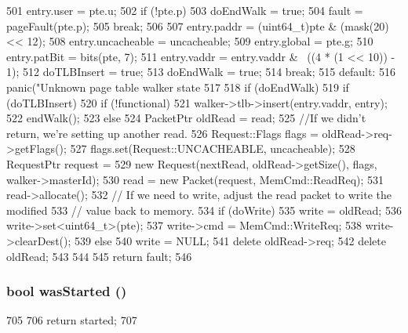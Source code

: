 \begin{DoxyCode}
{{501         entry.user = pte.u;
502         if (!pte.p) {
503             doEndWalk = true;
504             fault = pageFault(pte.p);
505             break;
506         }
507         entry.paddr = (uint64_t)pte & (mask(20) << 12);
508         entry.uncacheable = uncacheable;
509         entry.global = pte.g;
510         entry.patBit = bits(pte, 7);
511         entry.vaddr = entry.vaddr & ~((4 * (1 << 10)) - 1);
512         doTLBInsert = true;
513         doEndWalk = true;
514         break;
515       default:
516         panic("Unknown page table walker state %
517     }
518     if (doEndWalk) {
519         if (doTLBInsert)
520             if (!functional)
521                 walker->tlb->insert(entry.vaddr, entry);
522         endWalk();
523     } else {
524         PacketPtr oldRead = read;
525         //If we didn't return, we're setting up another read.
526         Request::Flags flags = oldRead->req->getFlags();
527         flags.set(Request::UNCACHEABLE, uncacheable);
528         RequestPtr request =
529             new Request(nextRead, oldRead->getSize(), flags, walker->masterId);
530         read = new Packet(request, MemCmd::ReadReq);
531         read->allocate();
532         // If we need to write, adjust the read packet to write the modified
533         // value back to memory.
534         if (doWrite) {
535             write = oldRead;
536             write->set<uint64_t>(pte);
537             write->cmd = MemCmd::WriteReq;
538             write->clearDest();
539         } else {
540             write = NULL;
541             delete oldRead->req;
542             delete oldRead;
543         }
544     }
545     return fault;
546 }
\end{DoxyCode}
\hypertarget{classX86ISA_1_1Walker_1_1WalkerState_a0335da57d5042e3a3dcfb9635cd3d1ca}{
\subsubsection[{wasStarted}]{\setlength{\rightskip}{0pt plus 5cm}bool wasStarted ()}}
\label{classX86ISA_1_1Walker_1_1WalkerState_a0335da57d5042e3a3dcfb9635cd3d1ca}



\begin{DoxyCode}
705 {
706     return started;
707 }
\end{DoxyCode}


